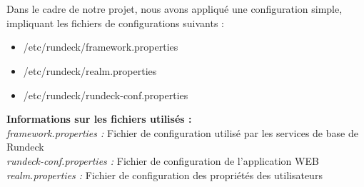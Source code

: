 \documentclass[12pt]{article}
\begin{document}
\\
\vspace{0.5cm}
\\
Dans le cadre de notre projet, nous avons appliqué une configuration simple, impliquant les fichiers de configurations suivants :
\begin{itemize}
    \item /etc/rundeck/framework.properties
    \item /etc/rundeck/realm.properties
    \item /etc/rundeck/rundeck-conf.properties
\end{itemize}
\vspace{0.5cm}
\textbf{Informations sur les fichiers utilisés :}
\\
\textit{framework.properties :} Fichier de configuration utilisé par les services de base de Rundeck
\\
\textit{rundeck-conf.properties :} Fichier de configuration de l'application WEB
\\
\textit{realm.properties :} Fichier de configuration des propriétés des utilisateurs
\end{document}
